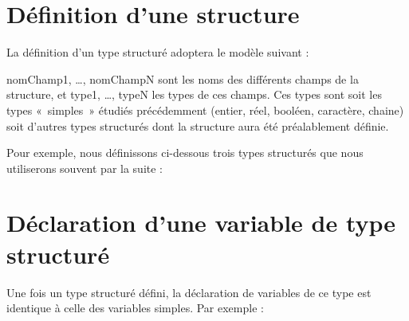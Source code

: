 \section{Définition d'une structure}

	La définition d’un type structuré adoptera le modèle suivant :


	nomChamp1, \dots, nomChampN 
	sont les noms des différents champs de la structure, 
	et type1, \dots, typeN les types de ces champs. 
	Ces types sont soit les types «~simples~» étudiés
	précédemment (entier, réel, booléen, caractère, chaine) soit d’autres
	types structurés dont la structure aura été préalablement définie.

	Pour exemple, nous définissons ci-dessous trois
	types structurés que nous utiliserons souvent par la suite :




\section{Déclaration d’une variable de type structuré}

	Une fois un type structuré défini, la
	déclaration de variables de ce type est identique à celle des variables
	simples. Par exemple :


